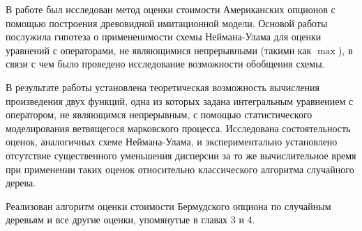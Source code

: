 \conclusion
В работе был исследован метод оценки стоимости Американских опционов с помощью построения древовидной имитационной модели. Основой работы послужила гипотеза о примененимости схемы Неймана-Улама для оценки уравнений с операторами, не являющимися непрерывными (такими как $\max$), в связи с чем было проведено исследование возможности обобщения схемы.

В результате работы установлена теоретическая возможность вычисления произведения двух функций, одна из которых задана интегральным уравнением с оператором, не являющимся непрерывным, с помощью статистического моделирования ветвящегося марковского процесса. Исследована состоятельность оценок, аналогичных схеме Неймана-Улама, и экспериментально установлено отсутствие существенного уменьшения дисперсии за то же вычислительное время при применении таких оценок относительно классического алгоритма случайного дерева.

Реализован алгоритм оценки стоимости Бермудского опциона по случайным деревьям и все другие оценки, упомянутые в главах 3 и 4.